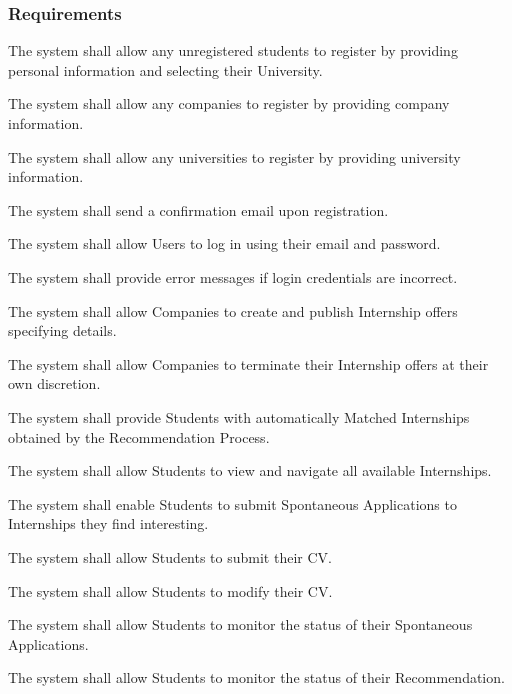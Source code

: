 \subsubsection{Requirements}
\begin{enumerate}[label={\color{titleColor}[R\arabic*]}]
    \item The system shall allow any unregistered students to register by providing personal information and selecting their University.
    \item The system shall allow any companies to register by providing company information.
    \item The system shall allow any universities to register by providing university information.
    \item The system shall send a confirmation email upon registration.
    \item The system shall allow Users to log in using their email and password.
    \item The system shall provide error messages if login credentials are incorrect.
    
    \item The system shall allow Companies to create and publish Internship offers specifying details.
    \item The system shall allow Companies to terminate their Internship offers at their own discretion.
    \item The system shall provide Students with automatically Matched Internships obtained by the Recommendation Process.
    \item The system shall allow Students to view and navigate all available Internships.
    \item The system shall enable Students to submit Spontaneous Applications to Internships they find interesting.
    \item The system shall allow Students to submit their CV.
    \item The system shall allow Students to modify their CV.
    \item The system shall allow Students to monitor the status of their Spontaneous Applications.
    \item The system shall allow Students to monitor the status of their Recommendation.
    

\end{enumerate}
